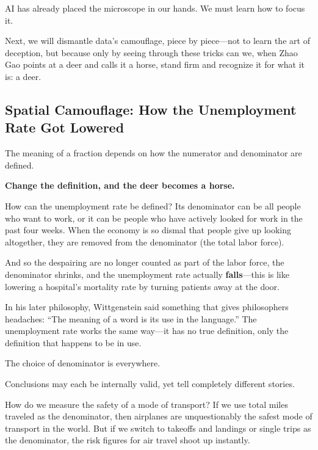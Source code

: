 \vspace{1em}

AI has already placed the microscope in our hands. We must learn how to focus it.

Next, we will dismantle data's camouflage, piece by piece---not to learn the art of deception, but because only by seeing through these tricks can we, when Zhao Gao points at a deer and calls it a horse, stand firm and recognize it for what it is: a deer.

\newpage
\subsection{Spatial Camouflage: How the Unemployment Rate Got Lowered}

The meaning of a fraction depends on how the numerator and denominator are defined.

\textbf{Change the definition, and the deer becomes a horse.}

\vspace{1em}

How can the unemployment rate be defined?
Its denominator can be all people who want to work, or it can be people who have actively looked for work in the past four weeks. When the economy is so dismal that people give up looking altogether, they are removed from the denominator (the total labor force).

And so the despairing are no longer counted as part of the labor force, the denominator shrinks, and the unemployment rate actually \textbf{falls}---this is like lowering a hospital's mortality rate by turning patients away at the door.

\vspace{1em}

In his later philosophy, Wittgenstein said something that gives philosophers headaches: ``The meaning of a word is its use in the language.'' The unemployment rate works the same way---it has no true definition, only the definition that happens to be in use.

\vspace{1em}

The choice of denominator is everywhere.

Conclusions may each be internally valid, yet tell completely different stories.

\vspace{1em}

How do we measure the safety of a mode of transport?
If we use total miles traveled as the denominator, then airplanes are unquestionably the safest mode of transport in the world. But if we switch to takeoffs and landings or single trips as the denominator, the risk figures for air travel shoot up instantly.

